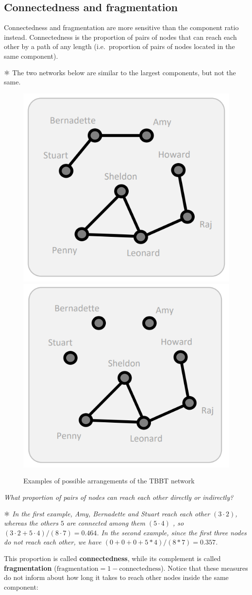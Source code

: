 \documentclass[
  notitlepage,
  onecolumn,
  openany]{book}
\begin{document}
\hypertarget{connectedness-and-fragmentation}{%
\subsection{Connectedness and fragmentation}\label{connectedness-and-fragmentation}}

Connectedness and fragmentation are more sensitive than the component ratio instead. Connectedness is the proportion of pairs of nodes that can reach each other by a path of any length (i.e.~proportion of pairs of nodes located in the same component).

⚛️ The two networks below are similar to the largest components, but not the same.

\begin{figure}

{\centering \includegraphics[width=0.3\linewidth]{images/03-Cohesion measures/Untitled 2} \includegraphics[width=0.3\linewidth]{images/03-Cohesion measures/Untitled 3} 

}

\caption{Examples of possible arrangements of the TBBT network}\label{fig:unnamed-chunk-7}
\end{figure}

\emph{What proportion of pairs of nodes can reach each other directly or indirectly?}

⚛️ \emph{In the first example, Amy, Bernadette and Stuart reach each other \((3\cdot2)\), whereas the others \(5\) are connected among them \((5\cdot4)\) , so \((3\cdot2+5\cdot4)/(8\cdot7) = 0.464\).
In the second example, since the first three nodes do not reach each other, we have \((0+0+0+5*4)/(8*7) = 0.357\).}

This proportion is called \textbf{connectedness}, while its complement is called \textbf{fragmentation} (\(\text{fragmentation} = 1-\text{connectedness}\)). Notice that these measures do not inform about how long it takes to reach other nodes inside the same component:
\end{document}
